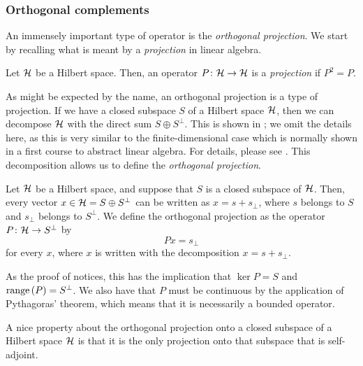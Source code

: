 \subsubsection{Orthogonal complements}

An immensely important type of operator is the {\emph{orthogonal projection}}. We start by recalling what is meant by a {\emph{projection}} in linear algebra.

\begin{definition}
  Let $\mathcal{H}$ be a Hilbert space. Then, an operator $P \colon \mathcal{H} \to \mathcal{H}$ is a {\emph{projection}} if $P^2 = P$.
\end{definition}

As might be expected by the name, an orthogonal projection is a type of projection. If we have a closed subspace $S$ of a Hilbert space $\mathcal{H}$, then we can decompose $\mathcal{H}$ with the direct sum $S \oplus S^{\perp}$. This is shown in {\cite[Theorem 10.12]{muscat}}; we omit the details here, as this is very similar to the finite-dimensional case which is normally shown in a first course to abstract linear algebra. For details, please see {\cite[Theorem 10.12]{muscat}}. This decomposition allows us to define the {\emph{orthogonal projection}}.

\begin{definition}
  Let $\mathcal{H}$ be a Hilbert space, and suppose that $S$ is a closed subspace of $\mathcal{H}$. Then, every vector $x \in \mathcal{H} = S \oplus S^\perp$ can be written as $x = s + s_{\perp}$, where $s$ belongs to $S$ and $s_{\perp}$ belongs to $S^{\perp}$. We define the orthogonal projection as the operator $P \colon \mathcal{H} \to S^{\perp}$ by
  \begin{equation*}
   Px = s_{\perp}
  \end{equation*}
  for every $x$, where $x$ is written with the decomposition $x = s + s_{\perp}$.
\end{definition}
\begin{remark}
  As the proof of {\cite[Theorem 10.12]{muscat}} notices, this has the implication that $\ker{P} = S$ and $\operatorname{range}\left(P\right) = S^{\perp}$. We also have that $P$ must be continuous by the application of Pythagoras' theorem, which means that it is necessarily a bounded operator.
\end{remark}

A nice property about the orthogonal projection onto a closed subspace of a Hilbert space $\mathcal{H}$ is that it is the only projection onto that subspace that is self-adjoint.

